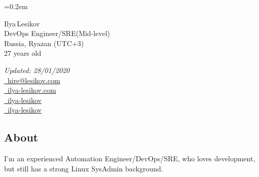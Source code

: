 \documentclass[11pt, a4paper]{article}
\newcommand{\Delimitline}{
  \vspace{-2ex}
  \noindent\makebox[\linewidth]{\rule{\DelimitlineLength}{0.12ex}} }
\newcommand{\forceindent}{\leavevmode{\parindent=1em\indent}}
\begin{document}
\sffamily

\font=0.2em

\newlength{\DelimitlineLength}
\setlength{\DelimitlineLength}{\textwidth+1em}

\pagecolor[RGB]{245,245,245}


{\setlength\multicolsep{0pt}%
\begin{multicols}{2}
  \begin{spacing}{1.6}
  \rmfamily
  \raggedright
  {\huge Ilya\,Lesikov}\vspace{1ex}\\
  {\Large DevOps Engineer/SRE\hspace{0.35em}(Mid-level)}\\
  {\Large Russia, Ryazan (UTC+3)}\\
  {\Large 27 years old}
\end{spacing}

\columnbreak

\begin{flushright}
  \begin{spacing}{1.3}
    \rmfamily
    \textit{Updated: 28/01/2020}\\[0.5ex]
    \large{
      \faEnvelope \href{mailto:hire@lesikov.com}{\ hire@lesikov.com}\\
      \faInternetExplorer \href{https://ilya-lesikov.com}{\ ilya-lesikov.com}\\
      \faLinkedin \href{https://www.linkedin.com/in/ilya-lesikov}{\ ilya-lesikov}\\
      \faGithubAlt \href{https://github.com/ilya-lesikov}{\ ilya-lesikov}}
  \end{spacing}
\end{flushright}

\end{multicols}
}

\vspace{2ex}


\subsection*{About}
\Delimitline

\forceindent I'm an experienced Automation Engineer/DevOps/SRE, who loves development, but still has a strong Linux SysAdmin background.
\end{document}
